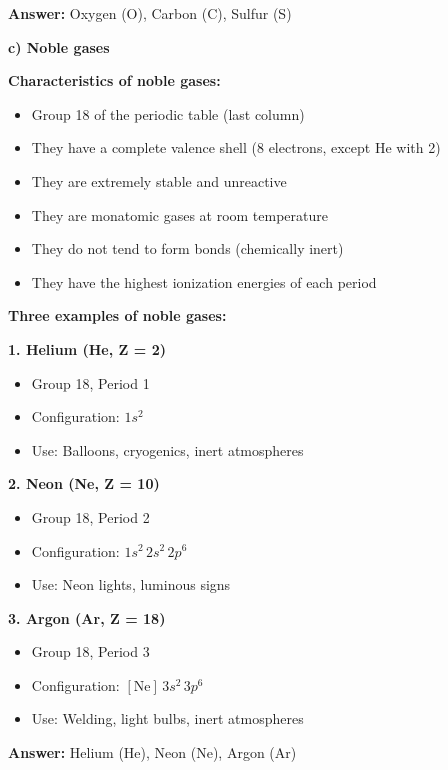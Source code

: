 \begin{exercise}
\begin{solu}
        \textbf{Answer:} Oxygen (O), Carbon (C), Sulfur (S)

        \textbf{c) Noble gases}

        \textbf{Characteristics of noble gases:}
        \begin{itemize}
            \item Group 18 of the periodic table (last column)
            \item They have a complete valence shell (8 electrons, except He with 2)
            \item They are extremely stable and unreactive
            \item They are monatomic gases at room temperature
            \item They do not tend to form bonds (chemically inert)
            \item They have the highest ionization energies of each period
        \end{itemize}

        \textbf{Three examples of noble gases:}

        \textbf{1. Helium (He, Z = 2)}
        \begin{itemize}
            \item Group 18, Period 1
            \item Configuration: \(1s^2\)
            \item Use: Balloons, cryogenics, inert atmospheres
        \end{itemize}

        \textbf{2. Neon (Ne, Z = 10)}
        \begin{itemize}
            \item Group 18, Period 2
            \item Configuration: \(1s^2 \, 2s^2 \, 2p^6\)
            \item Use: Neon lights, luminous signs
        \end{itemize}

        \textbf{3. Argon (Ar, Z = 18)}
        \begin{itemize}
            \item Group 18, Period 3
            \item Configuration: \([\text{Ne}] \, 3s^2 \, 3p^6\)
            \item Use: Welding, light bulbs, inert atmospheres
        \end{itemize}

        \textbf{Answer:} Helium (He), Neon (Ne), Argon (Ar)


\end{solu}
\end{exercise}
